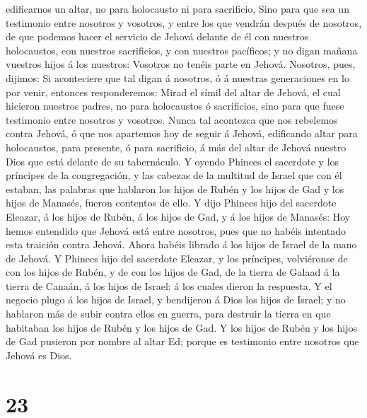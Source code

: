 edificarnos un altar, no para holocausto ni para sacrificio,
 Sino para que sea un testimonio entre nosotros y
vosotros, y entre los que vendrán después de nosotros, de que podemos
hacer el servicio de Jehová delante de él con nuestros holocaustos, con
nuestros sacrificios, y con nuestros pacíficos; y no digan mañana
vuestros hijos á los nuestros: Vosotros no tenéis parte en Jehová.
 Nosotros, pues, dijimos: Si aconteciere que tal digan á
nosotros, ó á nuestras generaciones en lo por venir, entonces
responderemos: Mirad el símil del altar de Jehová, el cual hicieron
nuestros padres, no para holocaustos ó sacrificios, sino para que fuese
testimonio entre nosotros y vosotros.  Nunca tal
acontezca que nos rebelemos contra Jehová, ó que nos apartemos hoy de
seguir á Jehová, edificando altar para holocaustos, para presente, ó
para sacrificio, á más del altar de Jehová nuestro Dios que está delante
de su tabernáculo.  Y oyendo Phinees el sacerdote y los
príncipes de la congregación, y las cabezas de la multitud de Israel que
con él estaban, las palabras que hablaron los hijos de Rubén y los hijos
de Gad y los hijos de Manasés, fueron contentos de ello. 
Y dijo Phinees hijo del sacerdote Eleazar, á los hijos de Rubén, á los
hijos de Gad, y á los hijos de Manasés: Hoy hemos entendido que Jehová
está entre nosotros, pues que no habéis intentado esta traición contra
Jehová. Ahora habéis librado á los hijos de Israel de la mano de Jehová.
 Y Phinees hijo del sacerdote Eleazar, y los príncipes,
volviéronse de con los hijos de Rubén, y de con los hijos de Gad, de la
tierra de Galaad á la tierra de Canaán, á los hijos de Israel: á los
cuales dieron la respuesta.  Y el negocio plugo á los
hijos de Israel, y bendijeron á Dios los hijos de Israel; y no hablaron
más de subir contra ellos en guerra, para destruir la tierra en que
habitaban los hijos de Rubén y los hijos de Gad.  Y los
hijos de Rubén y los hijos de Gad pusieron por nombre al altar Ed;
porque es testimonio entre nosotros que Jehová es Dios.

\hypertarget{section-22}{%
\section{23}\label{section-22}}

